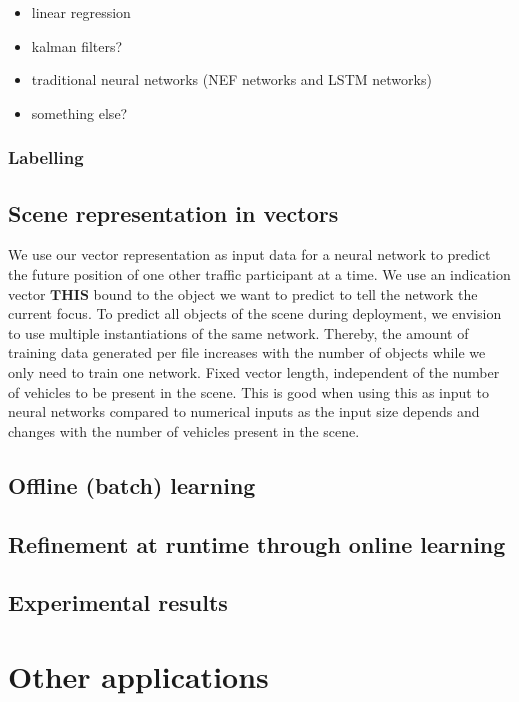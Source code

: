 \begin{itemize}
	\item linear regression
	\item kalman filters?
	\item traditional neural networks (\ac{NEF} networks and \ac{LSTM} networks)
	\item something else?
\end{itemize}
\subsubsection{Labelling}

\subsection{Scene representation in vectors}
We use our vector representation as input data for a neural network to predict the future position of one other traffic participant at a time.
We use an indication vector $\mathbf{THIS}$ bound to the object we want to predict to tell the network the current focus.
To predict all objects of the scene during deployment, we envision to use multiple instantiations of the same network.
Thereby, the amount of training data generated per file increases with the number of objects while we only need to train one network.
Fixed vector length, independent of the number of vehicles to be present in the scene.
This is good when using this as input to neural networks compared to numerical inputs as the input size depends and changes with the number of vehicles present in the scene.
\subsection{Offline (batch) learning}
\subsection{Refinement at runtime through online learning}
\subsection{Experimental results}
\section{Other applications}
